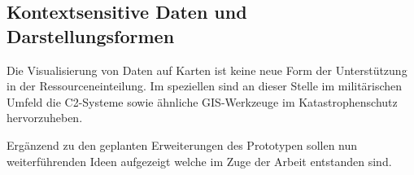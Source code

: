 \documentclass[Bachelorarbeit.tex]{subfiles}
\begin{document}
\subsection*{Kontextsensitive Daten und Darstellungsformen}
Die Visualisierung von Daten auf Karten ist keine neue Form der Unterstützung in der Ressourceneinteilung. 
Im speziellen sind an dieser Stelle im militärischen Umfeld die \ac{C2}-Systeme sowie ähnliche \ac{GIS}-Werkzeuge im Katastrophenschutz hervorzuheben.

Ergänzend zu den geplanten Erweiterungen des Prototypen sollen nun weiterführenden Ideen aufgezeigt welche im Zuge der Arbeit entstanden sind.

\begin{comment}
\subsection*{Motivation und erste Überlegungen}
Die Motivation dieser Arbeit besteht darin die Planung bei der Ressourceneinteilung zu optimieren, konkret an dem Beispiel der Außendienstplanung. 
Auf Grund von Gesprächen erfuhr ich wie Umständlich die Planung von Außendiensttätigkeiten, mit den zur Verfügung stehenden Mitteln ist und setzte mir das Ziel zu untersuchen wie diese Arbeit erleichtert und optimiert werden kann.\\
\\
Anhand erster Überlegungen wurde eine Problemstellung aufgesetzt welche für den weiteren Vorgang der Arbeit als Grundlage dienen soll. 
Dabei muss beachtet werden das es sich bei der Problemstellung (siehe Gleichnamigen Abschnitt im Kapitel Einführung) um reine Annahmen handelt, da der Autor keine eigene Erfahrungen auf dem Gebiet der Außendienstplanung besitzt.
Im speziellen wurden dabei die Themen verteilte Informationen, Komplexität und Wissensmanagement identifiziert (siehe Abschnitt \nameref{chap:einfuehrung:sec:problemstellung})
Mittels der Annahmen aus der Problemstellung wurden erste Lösungsansätze entwickelt um zu erfahren ob und wie diese hypothetischen Problem lösbar sind.
Dafür wurde unter anderem überlegt der Komplexität mit Hilfe von verschiedenen Visualisierungsformen (Karten- und Listenansicht) entgegenzutreten.
Auf Basis dieser Erkenntnisse wurde ein mögliches Anwendungsszenario entworfen wie ein fiktiver Prototyp verwendet werden könnte.

\subsection*{Überblick der bestehenden Konzepte}
Darauf hin wurde untersucht wie etablierte Webseiten, mit einem ähnlichen Aufgabengebiet, ihre Informationen visualisieren und was sie den Nutzer\_innen für Möglichkeiten bieten (siehe Kapitel \nameref{chap:analyse}). 
Zusätzlich zu den bestehenden Lösungen wurden technischen Möglichkeiten betrachtet mit dessen Hilfe sich ein Prototyp realisieren lässt.
Anhand der Bedarfsanforderung (siehe gleichnamigen Abschnitt) wurde für diesen Zweck Leaflet.js, aufgrund der Abdeckung der Anforderung sowie seiner einfachen Verwendungsweise und, ausgewählt (siehe Abschnitt \nameref{AuswahlDerTechnologie}).


\end{comment}
\end{document}
